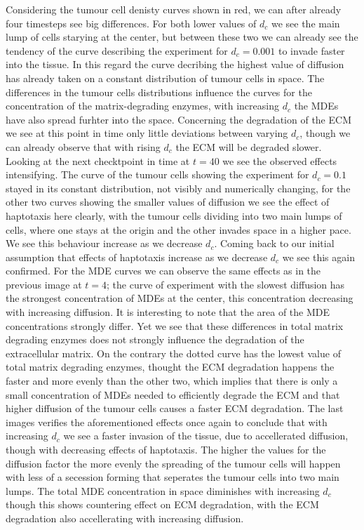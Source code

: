 Considering the tumour cell denisty curves shown in red, we can after already four timesteps see big differences. For both lower values of $d_c$ we see the main lump of cells starying at the center, but between these two we can already see the tendency of the curve describing the experiment for $d_c=0.001$ to invade faster into the tissue. In this regard the curve decribing the highest value of diffusion has already taken on a constant distribution of tumour cells in space. The differences in the tumour cells distributions influence the curves for the concentration of the matrix-degrading enzymes, with increasing $d_c$ the MDEs have also spread furhter into the space. Concerning the degradation of the ECM we see at this point in time only little deviations between varying $d_c$, though  we can already observe that with rising $d_c$ the ECM will be degraded slower. \newline
Looking at the next checktpoint in time at $t=40$ we see the observed effects intensifying. The curve of the tumour cells showing the experiment for $d_c=0.1$ stayed in its constant distribution, not visibly and numerically changing, for the other two curves showing the smaller values of diffusion we see the effect of haptotaxis here clearly, with the tumour cells dividing into two main lumps of cells, where one stays at the origin and the other invades space in a higher pace. We see this behaviour increase as we decrease $d_c$. Coming back to our initial assumption that effects of haptotaxis increase as we decrease $d_c$ we see this again confirmed. For the MDE curves we can observe the same effects as in the previous image at $t=4$; the curve of experiment with the slowest diffusion has the strongest concentration of MDEs at the center, this concentration decreasing with increasing diffusion. It is interesting to note that the area of the MDE concentrations strongly differ. Yet we see that these differences in total matrix degrading enzymes does not strongly influence the degradation of the extracellular matrix. On the contrary the dotted curve has the lowest value of total matrix degrading enzymes, thought the ECM degradation happens the faster and more evenly than the other two, which implies that there is only a small concentration of MDEs needed to efficiently degrade the ECM and that higher diffusion of the tumour cells causes a faster ECM degradation. \newline 
The last images verifies the aforementioned effects once again to conclude that with increasing $d_c$ we see a faster invasion of the tissue, due to accellerated diffusion, though with decreasing effects of haptotaxis. The higher the values for the diffusion factor the more evenly the spreading of the tumour cells will happen with less of a secession forming that seperates the tumour cells into two main lumps. The total MDE concentration in space diminishes with increasing $d_c$ though this shows countering effect on ECM degradation, with the ECM degradation also accellerating with increasing diffusion.

